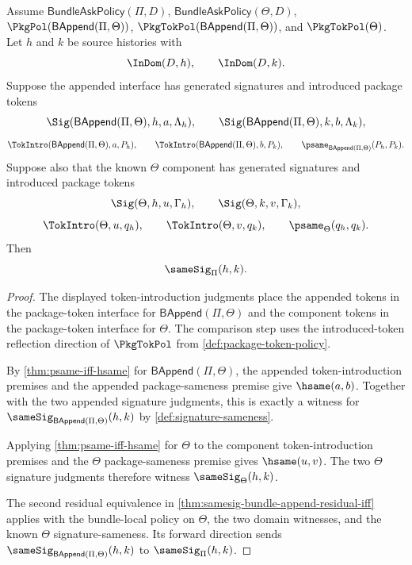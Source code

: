 \begin{theorem}
\label{thm:signature-append-residual-known-right-token-component}
Assume $\mathsf{BundleAskPolicy}(\Pi,D)$, $\mathsf{BundleAskPolicy}(\Theta,D)$,
$\PkgPol(\mathsf{BAppend}(\Pi,\Theta))$,
$\PkgTokPol(\mathsf{BAppend}(\Pi,\Theta))$, and $\PkgTokPol(\Theta)$.
Let $h$ and $k$ be source histories with
$$
\InDom(D,h),\qquad \InDom(D,k).
$$
Suppose the appended interface has generated signatures and introduced package tokens
$$
\Sig(\mathsf{BAppend}(\Pi,\Theta),h,a,\Lambda_h),\qquad
\Sig(\mathsf{BAppend}(\Pi,\Theta),k,b,\Lambda_k),
$$
$$
\TokIntro(\mathsf{BAppend}(\Pi,\Theta),a,P_h),\qquad
\TokIntro(\mathsf{BAppend}(\Pi,\Theta),b,P_k),\qquad
\psame_{\mathsf{BAppend}(\Pi,\Theta)}(P_h,P_k).
$$
Suppose also that the known $\Theta$ component has generated signatures and introduced package tokens
$$
\Sig(\Theta,h,u,\Gamma_h),\qquad
\Sig(\Theta,k,v,\Gamma_k),
$$
$$
\TokIntro(\Theta,u,q_h),\qquad
\TokIntro(\Theta,v,q_k),\qquad
\psame_{\Theta}(q_h,q_k).
$$
Then
$$
\sameSig_{\Pi}(h,k).
$$
\end{theorem}

\begin{proof}
The displayed token-introduction judgments place the appended tokens in the package-token interface for $\mathsf{BAppend}(\Pi,\Theta)$ and the component tokens in the package-token interface for $\Theta$. The comparison step uses the introduced-token reflection direction of $\PkgTokPol$ from \autoref{def:package-token-policy}.

By \autoref{thm:psame-iff-hsame} for $\mathsf{BAppend}(\Pi,\Theta)$, the appended token-introduction premises and the appended package-sameness premise give $\hsame(a,b)$. Together with the two appended signature judgments, this is exactly a witness for $\sameSig_{\mathsf{BAppend}(\Pi,\Theta)}(h,k)$ by \autoref{def:signature-sameness}.

Applying \autoref{thm:psame-iff-hsame} for $\Theta$ to the component token-introduction premises and the $\Theta$ package-sameness premise gives $\hsame(u,v)$. The two $\Theta$ signature judgments therefore witness $\sameSig_{\Theta}(h,k)$.

The second residual equivalence in \autoref{thm:samesig-bundle-append-residual-iff} applies with the bundle-local policy on $\Theta$, the two domain witnesses, and the known $\Theta$ signature-sameness. Its forward direction sends $\sameSig_{\mathsf{BAppend}(\Pi,\Theta)}(h,k)$ to $\sameSig_{\Pi}(h,k)$.
\end{proof}

